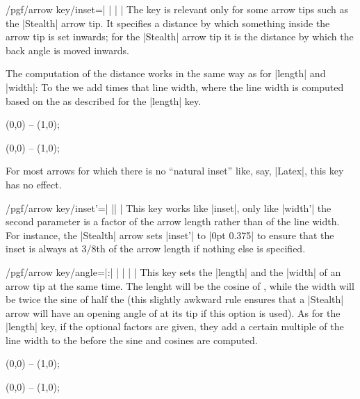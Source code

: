 \begin{key}{/pgf/arrow key/inset=| |%
    | |}
  The key is relevant only for some arrow tips such as the |Stealth|
  arrow tip. It specifies a distance by which something inside the
  arrow tip is set inwards; for the |Stealth| arrow tip it is the
  distance by which the back angle is moved inwards.

  The computation of the distance works in the same way as for
  |length| and |width|: To the  we add  times that line width, where the line width is
  computed based on the  as described for the
  |length| key.
\begin{codeexample}[]
\tikz \draw [arrows = {-Stealth[length=10pt, inset=5pt]}] (0,0) -- (1,0);
\end{codeexample}
\begin{codeexample}[]
\tikz \draw [arrows = {-Stealth[length=10pt, inset=2pt]}] (0,0) -- (1,0);
\end{codeexample}

  For most arrows for which there is no ``natural inset'' like, say,
  |Latex|, this key has no effect.
\end{key}


\begin{key}{/pgf/arrow key/inset'=| || |}
  This key works like |inset|, only like |width'| the second parameter
  is a factor of the arrow length rather than of the line width. For
  instance, the |Stealth| arrow sets |inset'| to |0pt 0.375| to ensure
  that the inset is always at $3/8$th of the arrow length if nothing
  else is specified.
\end{key}



\begin{key}{/pgf/arrow key/angle=|:|%
    | |%
    | |}
  This key sets the |length| and the |width| of an arrow tip at the
  same time. The lenght will be the cosine of , while the
  width will be twice the sine of half the  (this slightly
  awkward rule ensures that a |Stealth| arrow will have an opening
  angle of  at its tip if this option is used). As for the
  |length| key, if the optional factors are given, they add a certain
  multiple of the line width to the  before the sine
  and cosines are computed.
\begin{codeexample}[]
\tikz \draw [arrows = {-Stealth[inset=0pt, angle=90:10pt]}] (0,0) -- (1,0);
\end{codeexample}
\begin{codeexample}[]
\tikz \draw [arrows = {-Stealth[inset=0pt, angle=30:10pt]}] (0,0) -- (1,0);
\end{codeexample}
\end{key}



